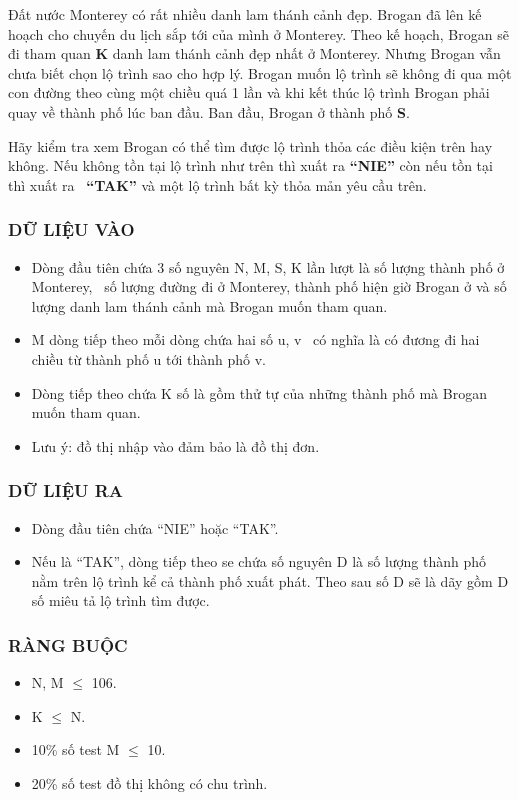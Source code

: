 

Đất nước Monterey có rất nhiều danh lam thánh cảnh đẹp. Brogan đã lên kế hoạch cho chuyến du lịch sắp tới của mình ở Monterey. Theo kế hoạch, Brogan sẽ đi tham quan \textbf{K} danh lam thánh cảnh đẹp nhất ở Monterey. Nhưng Brogan vẫn chưa biết chọn lộ trình sao cho hợp lý. Brogan muốn lộ trình sẽ không đi qua một con đường theo cùng một chiều quá 1 lần và khi kết thúc lộ trình Brogan phải quay về thành phố lúc ban đầu. Ban đầu, Brogan ở thành phố \textbf{S}.

Hãy kiểm tra xem Brogan có thể tìm được lộ trình thỏa các điều kiện trên hay không. Nếu không tồn tại lộ trình như trên thì xuất ra \textbf{“NIE”} còn nếu tồn tại thì xuất ra  \textbf{“TAK”} và một lộ trình bất kỳ thỏa mản yêu cầu trên.

\subsubsection{DỮ LIỆU VÀO}
\begin{itemize}
	\item Dòng đầu tiên chứa 3 số nguyên N, M, S, K lần lượt là số lượng thành phố ở Monterey,  số lượng đường đi ở Monterey, thành phố hiện giờ Brogan ở và số lượng danh lam thánh cảnh mà Brogan muốn tham quan.
	\item M dòng tiếp theo mỗi dòng chứa hai số u, v  có nghĩa là có đương đi hai chiều từ thành phố u tới thành phố v.
	\item Dòng tiếp theo chứa K số là gồm thử tự của những thành phố mà Brogan muốn tham quan.
	\item Lưu ý: đồ thị nhập vào đảm bảo là đồ thị đơn.
\end{itemize}

\subsubsection{DỮ LIỆU RA}
\begin{itemize}
	\item Dòng đầu tiên chứa “NIE” hoặc “TAK”.
	\item Nếu là “TAK”, dòng tiếp theo se chứa số nguyên D là số lượng thành phố nằm trên lộ trình kể cả thành phố xuất phát. Theo sau số D sẽ là dãy gồm D số miêu tả lộ trình tìm được.
\end{itemize}

\subsubsection{RÀNG BUỘC}
\begin{itemize}
	\item N, M  $\le$  106.
	\item K  $\le$  N.
	\item 10\% số test M  $\le$  10.
	\item 20\% số test đồ thị không có chu trình.
\end{itemize}

